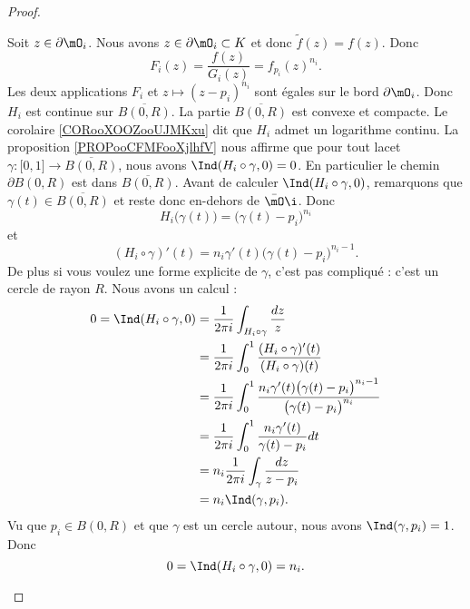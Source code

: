 \begin{proof}
\begin{subproof}
		Soit \( z\in\partial\mO_i\). Nous avons \( z\in\partial\mO_i\subset K\) et donc \( \tilde f(z)=f(z)\). Donc
		\begin{equation}
			F_i(z)=\frac{ f(z) }{ G_i(z) }=f_{p_i}(z)^{n_i}.
		\end{equation}
		Les deux applications \( F_i\) et \( z\mapsto (z-p_i)^{n_i}\) sont égales sur le bord \( \partial\mO_i\). Donc \( H_i\) est continue sur \( \overline{ B(0,R) }\).
		La partie \( \overline{ B(0,R) }\) est convexe et compacte. Le corolaire \ref{CORooXOOZooUJMKxu} dit que \( H_i\) admet un logarithme continu. La proposition \ref{PROPooCFMFooXjlhfV} nous affirme que pour tout lacet \( \gamma\colon \mathopen[ 0 , 1 \mathclose]\to \overline{ B(0,R) }\), nous avons \( \Ind(H_i\circ \gamma,0)=0\). En particulier le chemin \( \partial B(0,R)\) est dans \( \overline{ B(0,R) }\). Avant de calculer \( \Ind(H_i\circ\gamma,0)\), remarquons que \( \gamma(t)\in\overline{ B(0,R) }\) et reste donc en-dehors de \( \bar\mO\i\). Donc
		\begin{equation}
			H_i\big( \gamma(t) \big)=\big( \gamma(t)-p_i \big)^{n_i}
		\end{equation}
		et
		\begin{equation}
			(H_i\circ\gamma)'(t)=n_i\gamma'(t)\big( \gamma(t)-p_i \big)^{n_i-1}.
		\end{equation}
		De plus si vous voulez une forme explicite de \( \gamma\), c'est pas compliqué : c'est un cercle de rayon \( R\). Nous avons un calcul :
		\begin{subequations}
			\begin{align}
				0= \Ind(H_i\circ\gamma,0) & =\frac{1}{ 2\pi i }\int_{H_i\circ\gamma}\frac{ dz }{ z }                                                               \\
				                          & =\frac{1}{ 2\pi i }\int_0^1\frac{ (H_i\circ\gamma)'(t) }{ (H_i\circ\gamma)(t) }                                        \\
				                          & =\frac{1}{ 2\pi i  }\int_0^1\frac{ n_i\gamma'(t)\big( \gamma(t)-p_i \big)^{n_i-1} }{ \big( \gamma(t)-p_i \big)^{n_i} } \\
				                          & =\frac{1}{ 2\pi i }\int_0^1\frac{ n_i\gamma'(t) }{ \gamma(t)-p_i }dt                                                   \\
				                          & =n_i\frac{1}{ 2\pi i }\int_{\gamma}\frac{ dz }{ z-p_i }                                                                \\
				                          & =n_i\Ind(\gamma,p_i).
			\end{align}
		\end{subequations}
		Vu que \( p_i\in B(0,R)\) et que \( \gamma\) est un cercle autour, nous avons \( \Ind(\gamma,p_i)=1\). Donc
		\begin{equation}
			0=\Ind(H_i\circ \gamma,0)=n_i.
		\end{equation}
	\end{subproof}
\end{proof}

